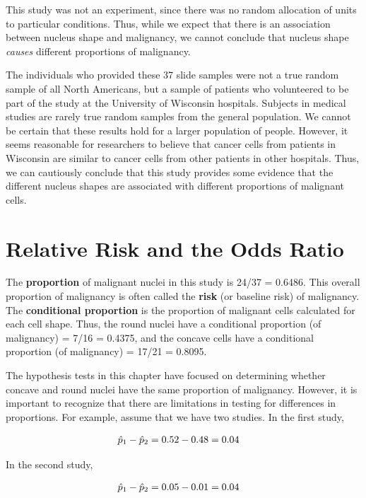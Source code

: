 \documentclass[
]{report}
\begin{document}
This study was not an experiment, since there was no random allocation of units to particular conditions. Thus, while we expect that there is an association between nucleus shape and malignancy, we cannot conclude that nucleus shape \emph{causes} different proportions of malignancy.

The individuals who provided these 37 slide samples were not a true random sample of all North Americans, but a sample of patients who volunteered to be part of the study at the University of Wisconsin hospitals. Subjects in medical studies are rarely true random samples from the general population. We cannot be certain that these results hold for a larger population of people. However, it seems reasonable for researchers to believe that cancer cells from patients in Wisconsin are similar to cancer cells from other patients in other hospitals. Thus, we can cautiously conclude that this study provides some evidence that the different nucleus shapes are associated with different proportions of malignant cells.

\section{\texorpdfstring{\textbf{Relative Risk and the Odds Ratio}}{Relative Risk and the Odds Ratio}}\label{relative-risk-and-the-odds-ratio}

The \textbf{proportion} of malignant nuclei in this study is 24/37 = 0.6486. This overall proportion of malignancy is often called the \textbf{risk} (or baseline risk) of malignancy. The \textbf{conditional proportion} is the proportion of malignant cells calculated for each cell shape. Thus, the round nuclei have a conditional proportion (of malignancy) = 7/16 = 0.4375, and the concave cells have a conditional proportion (of malignancy) = 17/21 = 0.8095.

The hypothesis tests in this chapter have focused on determining whether concave and round nuclei have the same proportion of malignancy. However, it is important to recognize that there are limitations in testing for differences in proportions. For example, assume that we have two studies. In the first study,

\begin{align}
\hat p_1 - \hat p_2 &= 0.52 - 0.48 = 0.04
\notag
\end{align}

In the second study,

\begin{align}
\hat p_1 - \hat p_2 &= 0.05 - 0.01 = 0.04 
\notag
\end{align}
\end{document}
